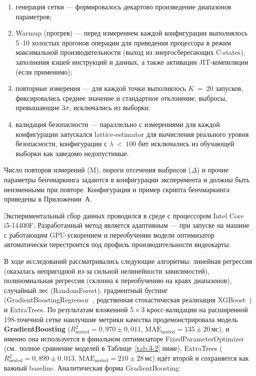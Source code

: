 \documentclass[a4paper, 12pt, oneside, openany]{article}
\begin{document}
\begin{enumerate}

 \item генерация сетки --- формировалось декартово произведение диапазонов параметров;
 
 
 \item Warmup (прогрев) --- перед измерением каждой конфигурации выполнялось 5--10 холостых прогонов операции для приведения процессора в режим максимальной производительности (выход из энергосберегающих C-states), заполнения кэшей инструкций и данных, а также активации JIT-компиляции (если применимо); 
 
 \item повторные измерения --- для каждой точки выполнялось \(K\  = \ 20\) запусков, фиксировались среднее значение и стандартное отклонение, выбросы, превышающие \(3\sigma\), исключались из выборки;
 
 \item  валидация безопасности --- параллельно с измерениями для каждой конфигурации запускался lattice-estimator для вычисления реального уровня безопасности, конфигурации с \(\lambda\  < \ 100\) бит исключались из обучающей выборки как заведомо недопустимые.
 
 \end{enumerate}

Число повторов измерений (M), пороги отсечения выбросов ($\Delta$) и прочие параметры бенчмаркинга задаются в конфигурации эксперимента и должны быть неизменными при повторе. Конфигурация и пример скрипта бенчмаркинга приведены в Приложении~А.

Экспериментальный сбор данных проводился в среде с процессором Intel Core i5-14400F. Разработанный метод является адаптивным --- при запуске на машине с работающим GPU-ускорением и переобучении модели оптимизатор автоматически перестроится под профиль производительности видеокарты.

В ходе исследований рассматривались следующие алгоритмы: линейная регрессия (оказалась непригодной из-за сильной нелинейности зависимостей), полиномиальная регрессия (склонна к переобучению на краях диапазонов), случайный лес (RandomForest), градиентный бустинг (GradientBoostingRegressor~\cite{ref26}, родственная стохастическая реализация XGBoost~\cite{ref25}) и ExtraTrees. По результатам вложенной 5\,$\times$\,3 кросс-валидации на расширенной 198-точечной сетке наилучшие метрики качества продемонстрировала модель \textbf{GradientBoosting} ($R^{2}_{\text{nested}} = 0{,}970 \pm 0{,}011$, $\mathrm{MAE}_{\text{nested}} = 135 \pm 20$\,мс), и именно она используется в финальном оптимизаторе FixedParameterOptimizer (см.\ полное сравнение моделей в Таблице~\ref{tab:3-2} ниже). ExtraTrees ($R^{2}_{\text{nested}} = 0{,}899 \pm 0{,}013$, $\mathrm{MAE}_{\text{nested}} = 210 \pm 28$\,мс) идёт второй и сохраняется как важный baseline. Аналитическая форма GradientBoosting:
\end{document}

